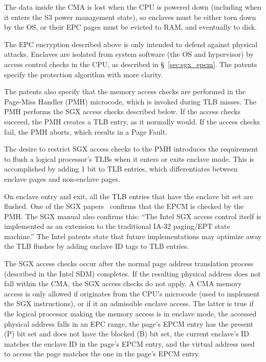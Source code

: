 The data inside the CMA is lost when the CPU is powered down (including when it
enters the S3 power management state), so enclaves must be either torn down by
the OS, or their EPC pages must be evicted to RAM, and eventually to disk.

The EPC encryption described above is only intended to defend against physical
attacks. Enclaves are isolated from system software (the OS and hypervisor) by
access control checks in the CPU, as described in \S~\ref{sec:sgx_epcm}. The
patents specify the protection algorithm with more clarity.

The patents also specify that the memory access checks are performed in the
Page-Miss Handler (PMH) microcode, which is invoked during TLB misses. The PMH
performs the SGX access checks described below. If the access checks succeed,
the PMH creates a TLB entry, as it normally would. If the access checks fail,
the PMH aborts, which results in a Page Fault.

The desire to restrict SGX
access checks to the PMH introduces the requirement to flush a logical
processor's TLBs when it enters or exits enclave mode. This is accomplished by
adding 1 bit to TLB entries, which differentiates between enclave pages and
non-enclave pages.

On enclave entry and exit, all the TLB entries that have the enclave bit set
are flushed. One of the SGX papers~\cite{mckeen2013sgx} confirms that the EPCM
is checked by the PMH.
The SGX manual also confirms this: ``The Intel SGX access control itself is
implemented as an extension to the traditional IA-32 paging/EPT state
machine.''
The Intel patents state that future implementations may optimize away the TLB
flushes by adding enclave ID tags to TLB entries.

The SGX access checks occur after the normal page address translation process
(described in the Intel SDM) completes.
If the resulting physical address does not fall within the CMA, the
SGX access checks do not apply.
A CMA memory access is only allowed if originates from the CPU's microcode
(used to implement the SGX instructions), or if it an admissible enclave
access.
The latter is true if the logical processor making the memory access is in
enclave mode, the accessed physical address falls in an EPC range, the page's
EPCM entry has the present (P) bit set and does not have the blocked (B) bit
set, the current enclave's ID matches the enclave ID in the page's EPCM entry,
and the virtual address used to access the page matches the one in the page's
EPCM entry.

